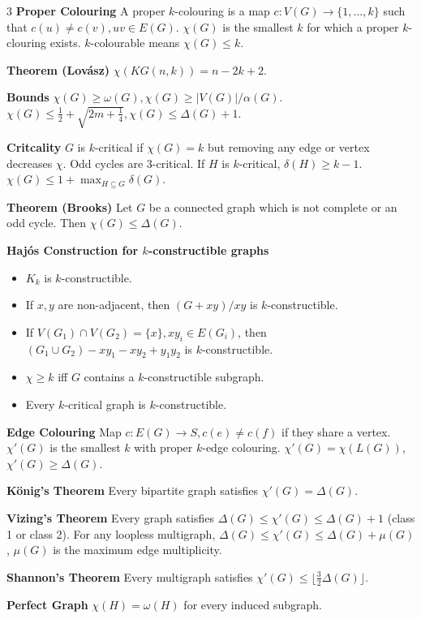 \documentclass[10pt, landscape]{article}
\begin{document}
\begin{multicols*}{3}
\textbf{Proper Colouring} A proper $k$-colouring is a map $c:V(G) \rightarrow \{1,...,k\}$ such that $c(u) \neq c(v), uv \in E(G)$. $\chi(G)$ is the smallest $k$ for which a proper $k$-clouring exists. $k$-colourable means $\chi(G) \leq k$.

\textbf{Theorem (Lovász)} $\chi(KG(n, k))=n-2k+2$.

\textbf{Bounds} $\chi(G) \geq \omega(G), \chi(G) \geq |V(G)|/\alpha(G)$. $\chi(G) \leq \frac{1}{2}+\sqrt{2m+\frac{1}{4}}, \chi(G) \leq \Delta(G)+1$.

\textbf{Critcality} $G$ is $k$-critical if $\chi(G)=k$ but removing any edge or vertex decreases $\chi$. Odd cycles are $3$-critical. If $H$ is $k$-critical, $\delta(H) \geq k-1$. $\chi(G) \leq 1 + \max_{H \subseteq G}\delta(G)$.

\textbf{Theorem (Brooks)} Let $G$ be a connected graph which is not complete or an odd cycle. Then $\chi(G) \leq \Delta(G)$.

\textbf{Hajós Construction for $k$-constructible graphs}
\begin{itemize}
    \item $K_k$ is $k$-constructible.
    \item If $x, y$ are non-adjacent, then $(G+xy)/xy$ is $k$-constructible.
    \item If $V(G_1) \cap V(G_2)=\{x\}, xy_i\in E(G_i)$, then $(G_1 \cup G_2)-xy_1-xy_2+y_1y_2$ is $k$-constructible.
    \item $\chi \geq k$ iff $G$ contains a $k$-constructible subgraph.
    \item Every $k$-critical graph is $k$-constructible.
\end{itemize}

\textbf{Edge Colouring} Map $c:E(G) \rightarrow S, c(e) \neq c(f)$ if they share a vertex. $\chi'(G)$ is the smallest $k$ with proper $k$-edge colouring. $\chi'(G)=\chi(L(G))$, $\chi'(G) \geq \Delta(G)$.

\textbf{König's Theorem} Every bipartite graph satisfies $\chi'(G) = \Delta(G)$.

\textbf{Vizing's Theorem} Every graph satisfies $\Delta(G) \leq \chi'(G) \leq \Delta(G)+1$ (class 1 or class 2). For any loopless multigraph, $\Delta(G) \leq \chi'(G) \leq \Delta(G) + \mu(G)$, $\mu(G)$ is the maximum edge multiplicity.

\textbf{Shannon's Theorem} Every multigraph satisfies $\chi'(G) \leq \lfloor \frac{3}{2}\Delta(G) \rfloor$.

\textbf{Perfect Graph} $\chi(H) = \omega(H)$ for every induced subgraph.


\end{multicols*}
\end{document}
